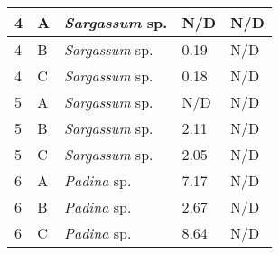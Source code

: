\documentclass[12pt]{article}
\begin{document}
\begin{longtable}{ | p{2cm} | p{2cm} | p{3cm} | p{3.5cm} | p{3.5cm} | }
4%
&A&\emph{Sargassum} sp.&N/D&N/D\\
\hline
4%
&B&\emph{Sargassum} sp.&0.19&N/D\\
\hline
4%
&C&\emph{Sargassum} sp.&0.18&N/D\\
\hline
5 %
&A&\emph{Sargassum} sp.&N/D&N/D\\
\hline
5 %
&B&\emph{Sargassum} sp.&2.11&N/D\\
\hline
5 %
&C&\emph{Sargassum} sp.&2.05&N/D\\
\hline
6 %
&A&\emph{Padina} sp.&7.17&N/D\\
\hline
6 %
&B&\emph{Padina} sp.&2.67&N/D\\
\hline
6 %
&C&\emph{Padina} sp.&8.64&N/D\\
\hline
\end{longtable}
\FloatBarrier
\FloatBarrier
\end{document}
